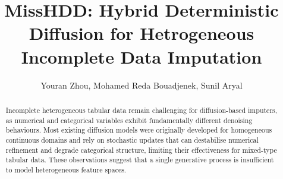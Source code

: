 \documentclass[times, review, 10pt]{elsarticle}
\begin{document}
\begin{frontmatter}



\title{MissHDD: Hybrid Deterministic Diffusion for Hetrogeneous Incomplete Data Imputation}


\author{Youran Zhou, Mohamed Reda Bouadjenek, Sunil Aryal} %



\begin{abstract}
Incomplete heterogeneous tabular data remain challenging for diffusion-based imputers, as numerical and categorical variables exhibit fundamentally different denoising behaviours. Most existing diffusion models were originally developed for homogeneous continuous domains and rely on stochastic updates that can destabilise numerical refinement and degrade categorical structure, limiting their effectiveness for mixed-type tabular data. These observations suggest that a single generative process is insufficient to model heterogeneous feature spaces.


\end{abstract}
\end{frontmatter}
\end{document}
